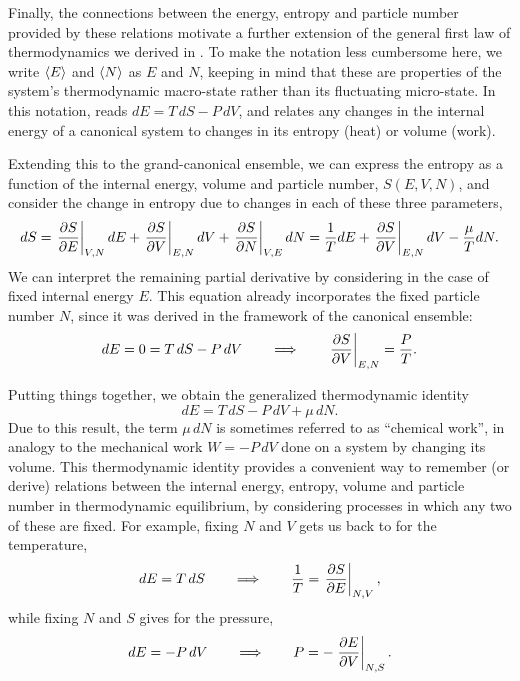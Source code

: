 Finally, the connections between the energy, entropy and particle number provided by these relations motivate a further extension of the general first law of thermodynamics we derived in .
To make the notation less cumbersome here, we write $\left\langle E \right\rangle$ and $\left\langle N \right\rangle$ as $E$ and $N$, keeping in mind that these are properties of the system's thermodynamic macro-state rather than its fluctuating micro-state.
In this notation,  reads $dE = T \, dS - P \, dV$, and relates any changes in the internal energy of a canonical system to changes in its entropy (heat) or volume (work).

Extending this to the grand-canonical ensemble, we can express the entropy as a function of the internal energy, volume and particle number, $S(E, V, N)$, and consider the change in entropy due to changes in each of these three parameters,
\begin{equation*}
  dS = \left.\frac{\partial S}{\partial E}\right|_{V, N} dE + \left.\frac{\partial S}{\partial V}\right|_{E, N} dV + \left.\frac{\partial S}{\partial N}\right|_{V, E} dN = \frac{1}{T} dE + \left.\frac{\partial S}{\partial V}\right|_{E, N} dV - \frac{\mu}{T} dN.
\end{equation*}
We can interpret the remaining partial derivative by considering  in the case of fixed internal energy $E$.
This equation already incorporates the fixed particle number $N$, since it was derived in the framework of the canonical ensemble:
\begin{equation*}
  dE = 0 = T \, dS - P \, dV \qquad \Longrightarrow \qquad \left.\frac{\partial S}{\partial V}\right|_{E, N} = \frac{P}{T}.
\end{equation*}

Putting things together, we obtain the generalized thermodynamic identity
\begin{equation}
  \label{eq:thermo_ident}
  dE = T \, dS - P \, dV + \mu \, dN.
\end{equation}
Due to this result, the term $\mu \, dN$ is sometimes referred to as ``chemical work'', in analogy to the mechanical work $W = - P \, dV$ done on a system by changing its volume.
This thermodynamic identity provides a convenient way to remember (or derive) relations between the internal energy, entropy, volume and particle number in thermodynamic equilibrium, by considering processes in which any two of these are fixed.
For example, fixing $N$ and $V$ gets us back to  for the temperature,
\begin{equation*}
  dE = T \, dS \qquad \Longrightarrow \qquad \frac{1}{T} = \left.\frac{\partial S}{\partial E}\right|_{N, V},
\end{equation*}
while fixing $N$ and $S$ gives  for the pressure,
\begin{equation*}
  dE = -P \, dV \qquad \Longrightarrow \qquad P = -\left.\frac{\partial E}{\partial V}\right|_{N, S}.
\end{equation*}

